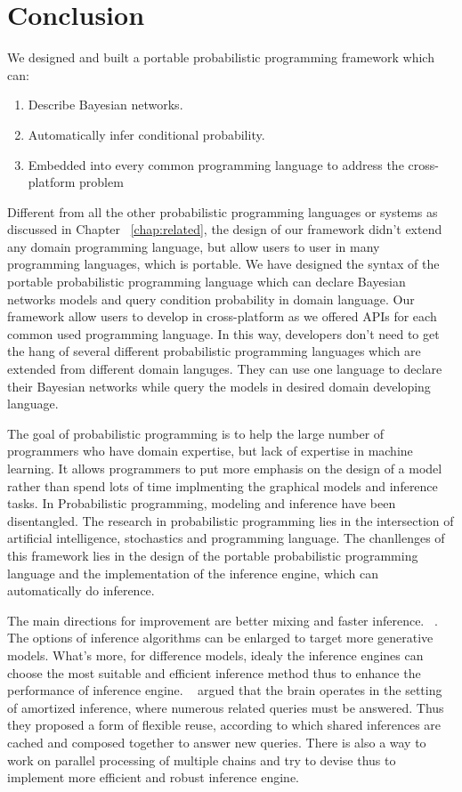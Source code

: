 \chapter{Conclusion}
\label{chap:conclusion}
We designed and built a portable probabilistic programming framework which can:
\begin{enumerate}
  \item Describe Bayesian networks. 
  \item Automatically infer conditional probability.
  \item Embedded into every common programming language to address the cross-platform problem
\end{enumerate}
Different from all the other probabilistic programming languages or systems as discussed in Chapter ~\ref{chap:related}, the design of our framework didn't extend any domain programming language, but allow users to user in many programming languages, which is portable. We have designed the syntax of the portable probabilistic programming language which can declare Bayesian networks models and query condition probability in domain language. Our framework allow users to develop in cross-platform as we offered APIs for each common used programming language. In this way, developers don't need to get the hang of several different probabilistic programming languages which are extended from different domain languges. They can use one language to declare their Bayesian networks while query the models in desired domain developing language.

The goal of probabilistic programming is to help the large number of programmers who have domain expertise, but lack of expertise in machine learning. It allows programmers to put more emphasis on the design of a model rather than spend lots of time implmenting the graphical models and inference tasks. In Probabilistic programming, modeling and inference have been disentangled. The research in probabilistic programming lies in the intersection of artificial intelligence, stochastics and programming language. The chanllenges of this framework lies in the design of the portable probabilistic programming language and the implementation of the inference engine, which can automatically do inference.

The main directions for improvement are better mixing and faster inference. ~\cite{goodman}. The options of inference algorithms can be enlarged to target more generative models. What's more, for difference models, idealy the inference engines can choose the most suitable and efficient inference method thus to enhance the performance of inference engine. ~\cite{amortized} argued that the brain operates in the setting of amortized inference, where numerous related queries must be answered. Thus they proposed a form of ﬂexible reuse, according to which shared inferences are cached and composed together to answer new queries. There is also a way to work on parallel processing of multiple chains and try to devise thus to implement more efficient and robust inference engine.
